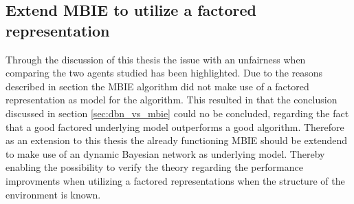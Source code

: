 \subsection{Extend MBIE to utilize a factored representation }
\label{sec:factored_mbie}
Through the discussion of this thesis the issue with an unfairness when comparing the two agents studied has been highlighted. Due to the reasons described in section  the MBIE algorithm did not make use of a factored representation as model for the algorithm. This resulted in that the conclusion discussed in section \ref{sec:dbn_vs_mbie} could no be concluded, regarding the fact that a good factored underlying model outperforms a good algorithm. Therefore as an extension to this thesis the already functioning MBIE should be extendend to make use of an dynamic Bayesian network as underlying model. Thereby enabling the possibility to verify the theory regarding the performance improvments when utilizing a factored representations when the structure of the environment is known.
